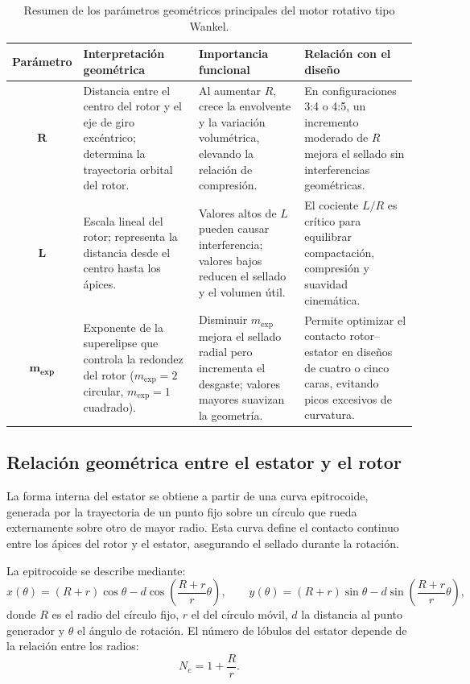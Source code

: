 \documentclass{LS}
\begin{document}
\begin{table}[H]
\centering
\caption{Resumen de los par\'ametros geom\'etricos principales del motor rotativo tipo Wankel.}
\label{tab:param_geom_motor}
\renewcommand{\arraystretch}{1.35}
\setlength{\tabcolsep}{6pt}
\small
\begin{tabular}{|c|p{4.2cm}|p{4.2cm}|p{4.2cm}|}
\hline
\textbf{Par\'ametro} & \textbf{Interpretaci\'on geom\'etrica} & \textbf{Importancia funcional} & \textbf{Relaci\'on con el dise\~no} \\ 
\hline
\(\boldsymbol{R}\) & 
Distancia entre el centro del rotor y el eje de giro exc\'entrico; determina la trayectoria orbital del rotor. &
Al aumentar \(R\), crece la envolvente y la variaci\'on volum\'etrica, elevando la relaci\'on de compresi\'on. &
En configuraciones 3:4 o 4:5, un incremento moderado de \(R\) mejora el sellado sin interferencias geom\'etricas. \\ 
\hline
\(\boldsymbol{L}\) &
Escala lineal del rotor; representa la distancia desde el centro hasta los \'apices. &
Valores altos de \(L\) pueden causar interferencia; valores bajos reducen el sellado y el volumen \'util. &
El cociente \(L/R\) es cr\'itico para equilibrar compactaci\'on, compresi\'on y suavidad cinem\'atica. \\ 
\hline
\(\boldsymbol{m_{\text{exp}}}\) &
Exponente de la superelipse que controla la redondez del rotor (\(m_{\text{exp}}=2\) circular, \(m_{\text{exp}}=1\) cuadrado). &
Disminuir \(m_{\text{exp}}\) mejora el sellado radial pero incrementa el desgaste; valores mayores suavizan la geometr\'ia. &
Permite optimizar el contacto rotor--estator en dise\~nos de cuatro o cinco caras, evitando picos excesivos de curvatura. \\ 
\hline
\end{tabular}
\end{table}



\subsection*{Relación geométrica entre el estator y el rotor}

La forma interna del estator se obtiene a partir de una curva epitrocoide, generada por la trayectoria de un punto fijo sobre un círculo que rueda externamente sobre otro de mayor radio. Esta curva define el contacto continuo entre los ápices del rotor y el estator, asegurando el sellado durante la rotación.

La epitrocoide se describe mediante:
\[
x(\theta) = (R + r)\cos\theta - d\cos\!\left(\frac{R + r}{r}\theta\right), \qquad
y(\theta) = (R + r)\sin\theta - d\sin\!\left(\frac{R + r}{r}\theta\right),
\]
donde \(R\) es el radio del círculo fijo, \(r\) el del círculo móvil, \(d\) la distancia al punto generador y \(\theta\) el ángulo de rotación. El número de lóbulos del estator depende de la relación entre los radios:
\[
N_e = 1 + \frac{R}{r}.
\]
\end{document}
